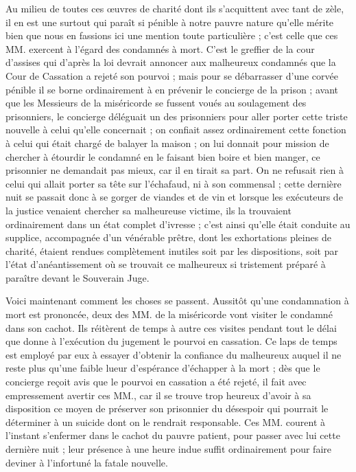 \documentclass[11pt,a4paper]{report}
\begin{document}
Au milieu de toutes ces œuvres de charité dont ils s'acquittent avec tant de zèle, il en est une surtout qui paraît si pénible à notre pauvre nature qu'elle mérite bien que nous en fassions ici une mention toute particulière ; c'est celle que ces MM. exercent à l'égard des condamnés à mort. C'est le greffier de la cour d'assises qui d'après la loi devrait annoncer aux malheureux condamnés que la Cour de Cassation a rejeté son pourvoi ; mais pour se débarrasser d'une corvée pénible il se borne ordinairement à en prévenir le concierge de la prison ; avant que les Messieurs de la miséricorde se fussent voués au soulagement des prisonniers, le concierge déléguait un des prisonniers pour aller porter cette triste nouvelle à celui qu'elle concernait ; on confiait assez ordinairement cette fonction à celui qui était chargé de balayer la maison ; on lui donnait pour mission de chercher à étourdir le condamné en le faisant bien boire et bien manger, ce prisonnier ne demandait pas mieux, car il en tirait sa part. On ne refusait rien à celui qui allait porter sa tête sur l'échafaud, ni à son commensal ; cette dernière nuit se passait donc à se gorger de viandes et de vin et lorsque les exécuteurs de la justice venaient chercher sa malheureuse victime, ils la trouvaient ordinairement dans un état complet d'ivresse ; c'est ainsi qu'elle était conduite au supplice, accompagnée d'un vénérable prêtre, dont les exhortations pleines de charité, étaient rendues complètement inutiles soit par les dispositions, soit par l'état d'anéantissement où se trouvait ce malheureux si tristement préparé à paraître devant le Souverain Juge.

Voici maintenant comment les choses se passent. Aussitôt qu'une condamnation à mort est prononcée, deux des MM. de la miséricorde vont visiter le condamné dans son cachot. Ils réitèrent de temps à autre ces visites pendant tout le délai que donne à l'exécution du jugement le pourvoi en cassation. Ce laps de temps est employé par eux à essayer d'obtenir la confiance du malheureux auquel il ne reste plus qu'une faible lueur d'espérance d'échapper à la mort ; dès que le concierge reçoit avis que le pourvoi en cassation a été rejeté, il fait avec empressement avertir ces MM., car il se trouve trop heureux d'avoir à sa disposition ce moyen de préserver son prisonnier du désespoir qui pourrait le déterminer à un suicide dont on le rendrait responsable. Ces MM. courent à l'instant s'enfermer dans le cachot du pauvre patient, pour passer avec lui cette dernière nuit ; leur présence à une heure indue suffit ordinairement pour faire deviner à l'infortuné la fatale nouvelle.
\end{document}
